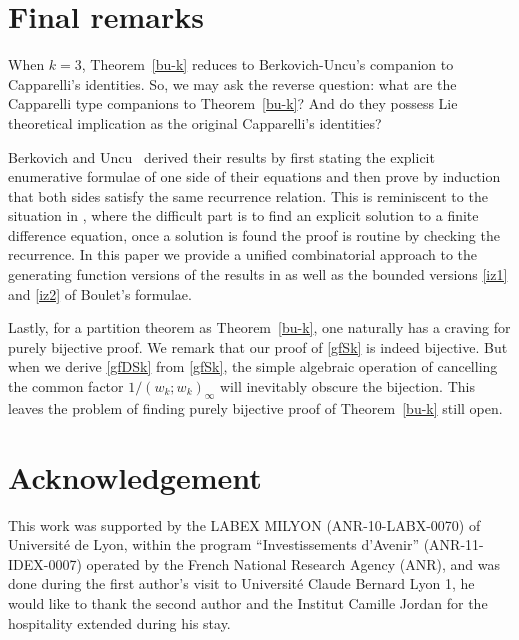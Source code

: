 \documentclass[12pt]{amsart}
\numberwithin{equation}{section}
\theoremstyle{plain}
\theoremstyle{definition}
\begin{document}
\section{Final remarks }{\label{sec: modk}}



When $k=3$, Theorem~\ref{bu-k} reduces to Berkovich-Uncu's companion to 
Capparelli's identities.
So, we may  ask the  reverse question:  what are the 
 Capparelli type companions to Theorem~\ref{bu-k}? And do they possess Lie theoretical implication as the original Capparelli's identities?

Berkovich and Uncu~\cite{bu1,bu2} derived their results by first stating the explicit 
enumerative formulae of one side of their equations 
and then  prove by induction  that both sides satisfy the same recurrence 
relation.    
This  is reminiscent to the situation in \cite{iz}, where  
the difficult part is to find an explicit solution to  a finite difference equation, once 
a solution is found the proof is routine by checking the recurrence. 
In this paper  we provide a unified combinatorial  approach to
 the generating function versions  of the results in \cite{bu1,bu2} as well as 
the  bounded versions \eqref{iz1} and \eqref{iz2} of Boulet's formulae.

Lastly, for a partition theorem as Theorem~\ref{bu-k}, one naturally has a craving for purely bijective proof. We remark that our proof of \eqref{gfSk} is indeed bijective. But when we derive \eqref{gfDSk} from \eqref{gfSk}, the simple algebraic operation of cancelling the common factor $1/(w_k;w_k)_{\infty}$ will inevitably obscure the bijection. This leaves the problem of finding purely bijective proof of Theorem~\ref{bu-k} still open.





 

\section*{Acknowledgement} 

This work 
was supported by the LABEX MILYON (ANR-10-LABX-0070) of Universit\'e de Lyon, within the program ``Investissements d'Avenir'' (ANR-11-IDEX-0007) operated by the French National Research Agency (ANR),  and was done during the first author's visit to Universit\'e Claude Bernard Lyon 1, he would like to thank the second author and the Institut Camille Jordan for the hospitality extended during his stay. 
 
\end{document}
